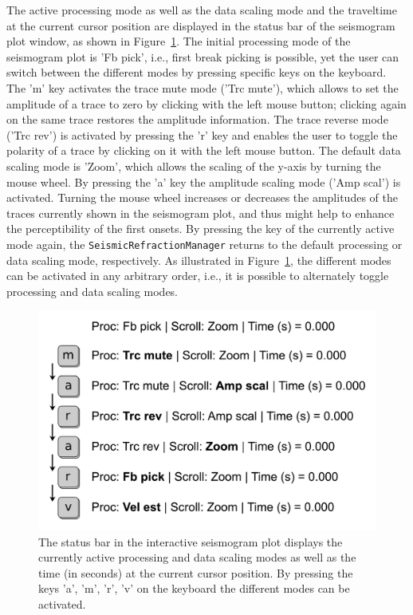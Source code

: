\documentclass[a4paper,fleqn]{cas-sc}
\begin{document}
The active processing mode as well as the data scaling mode and the traveltime at the current cursor position are displayed in the status bar of the seismogram plot window, as shown in Figure~\ref{fig:statusbar_intro}.
The initial processing mode of the seismogram plot is 'Fb pick', i.e., first break picking is possible, yet the user can switch between the different modes by pressing specific keys on the keyboard. The 'm' key activates the trace mute mode ('Trc mute'), which allows to set the amplitude of a trace to zero by clicking with the left mouse button; clicking again on the same trace restores the amplitude information. The trace reverse mode ('Trc rev') is activated by pressing the 'r' key and enables the user to toggle the polarity of a trace by clicking on it with the left mouse button. 
The default data scaling mode is 'Zoom', which allows the scaling of the y-axis by turning the mouse wheel. By pressing the 'a' key the amplitude scaling mode ('Amp scal') is activated. Turning the mouse wheel increases or decreases the amplitudes of the traces currently shown in the seismogram plot, and thus might help to enhance the perceptibility of the first onsets.
By pressing the key of the currently active mode again, the \texttt{SeismicRefractionManager} returns to the default processing or data scaling mode, respectively. As illustrated in Figure~\ref{fig:statusbar_intro}, the different modes can be activated in any arbitrary order, i.e., it is possible to alternately toggle processing and data scaling modes.
\begin{figure}
	\centering
	\includegraphics[width=.75\textwidth]{figures/status_bar.pdf}
	\caption{The status bar in the interactive seismogram plot displays the currently active processing and data scaling modes as well as the time (in seconds) at the current cursor position. By pressing the keys 'a', 'm', 'r', 'v' on the keyboard the different modes can be activated.}
	\label{fig:statusbar_intro}
\end{figure}
\end{document}
